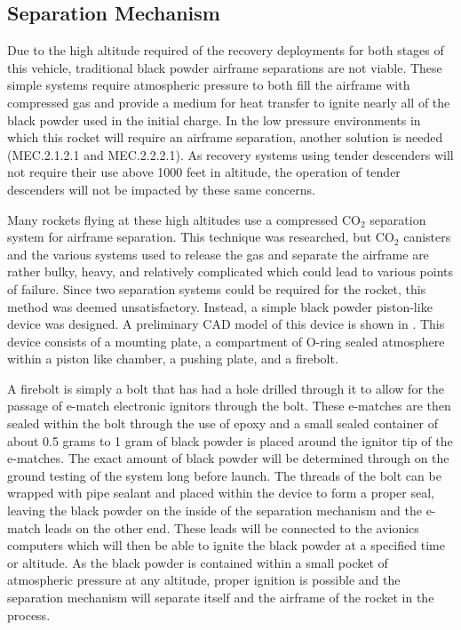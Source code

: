 \subsection{Separation Mechanism} \label{section:sep-mech}
Due to the high altitude required of the recovery deployments for both stages of this vehicle, traditional black powder airframe separations are not viable. These simple systems require atmospheric pressure to both fill the airframe with compressed gas and provide a medium for heat transfer to ignite nearly all of the black powder used in the initial charge. In the low pressure environments in which this rocket will require an airframe separation, another solution is needed (MEC.2.1.2.1 and MEC.2.2.2.1). As recovery systems using tender descenders will not require their use above 1000 feet in altitude, the operation of tender descenders will not be impacted by these same concerns. 

Many rockets flying at these high altitudes use a compressed CO\(_2\) separation system for airframe separation. This technique was researched, but CO\(_2\) canisters and the various systems used to release the gas and separate the airframe are rather bulky, heavy, and relatively complicated which could lead to various points of failure. Since two separation systems could be required for the rocket, this method was deemed unsatisfactory. Instead, a simple black powder piston-like device was designed. A preliminary CAD model of this device is shown in . This device consists of a mounting plate, a compartment of O-ring sealed atmosphere within a piston like chamber, a pushing plate, and a firebolt.

A firebolt is simply a bolt that has had a hole drilled through it to allow for the passage of e-match electronic ignitors through the bolt. These e-matches are then sealed within the bolt through the use of epoxy and a small sealed container of  about 0.5 grams to 1 gram of black powder is placed around the ignitor tip of the e-matches. The exact amount of black powder will be determined through on the ground testing of the system long before launch. The threads of the bolt can be wrapped with pipe sealant and placed within the device to form a proper seal, leaving the black powder on the inside of the separation mechanism and the e-match leads on the other end. These leads will be connected to the avionics computers which will then be able to ignite the black powder at a specified time or altitude. As the black powder is contained within a small pocket of atmospheric pressure at any altitude, proper ignition is possible and the separation mechanism will separate itself and the airframe of the rocket in the process.

